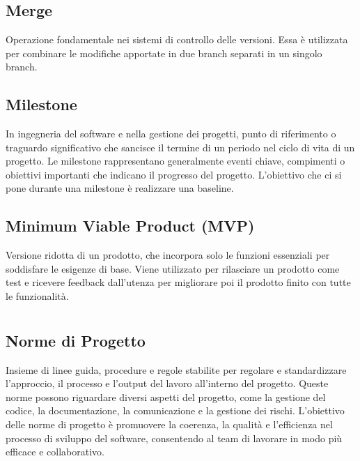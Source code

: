 
\section{}

\hypertarget{sec:merge}{}
\subsection*{Merge}
Operazione fondamentale nei sistemi di controllo delle versioni. Essa è utilizzata per combinare le modifiche apportate in due branch separati in un 
singolo branch.

\subsection*{Milestone}
In ingegneria del software e nella gestione dei progetti, punto di riferimento o traguardo significativo che sancisce il termine di un periodo nel ciclo 
di vita di un progetto. Le milestone rappresentano generalmente eventi chiave, compimenti o obiettivi importanti che indicano il progresso del progetto. 
L’obiettivo che ci si pone durante una milestone è realizzare una baseline.

\hypertarget{sec:MVP}{}
\subsection*{Minimum Viable Product (MVP)}
Versione ridotta di un prodotto, che incorpora solo le funzioni essenziali per soddisfare le esigenze di base. Viene utilizzato per rilasciare un prodotto 
come test e ricevere feedback dall’utenza per migliorare poi il prodotto finito con tutte le funzionalità.

\newpage



\section{}

\subsection*{Norme di Progetto}
Insieme di linee guida, procedure e regole stabilite per regolare e standardizzare l’approccio, il processo e l’output del lavoro all’interno del progetto. 
Queste norme possono riguardare diversi aspetti del progetto, come la gestione del codice, la documentazione, la comunicazione e la gestione dei rischi. 
L’obiettivo delle norme di progetto è promuovere la coerenza, la qualità e l’efficienza nel processo di sviluppo del software, consentendo al team di 
lavorare in modo più efficace e collaborativo.

